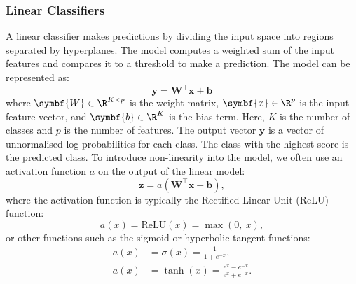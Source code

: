 \documentclass{article}
\begin{document}
\subsubsection{Linear Classifiers}
A linear classifier makes predictions by dividing the input space into
regions separated by hyperplanes. The model computes a weighted sum of
the input features and compares it to a threshold to make a prediction.
The model can be represented as:
\begin{equation*}
    \symbf{y} = \symbf{W}^\top \symbf{x} + \symbf{b}
\end{equation*}
where \(\symbf{W} \in \R^{K \times p}\) is the weight matrix,
\(\symbf{x} \in \R^p\) is the input feature vector, and
\(\symbf{b} \in \R^K\) is the bias term. Here, \(K\) is the
number of classes and \(p\) is the number of features. The output vector
\(\symbf{y}\) is a vector of unnormalised log-probabilities for each
class. The class with the highest score is the predicted class. To
introduce non-linearity into the model, we often use an activation
function \(a\) on the output of the linear model:
\begin{equation*}
    \symbf{z} = a\left( \symbf{W}^\top \symbf{x} + \symbf{b} \right),
\end{equation*}
where the activation function is typically the Rectified Linear Unit
(ReLU) function:
\begin{equation*}
    a\left( x \right) = \mathrm{ReLU}\left( x \right) = \max\left( 0,\: x \right),
\end{equation*}
or other functions such as the sigmoid or hyperbolic tangent functions:
\begin{align*}
    a\left( x \right) & = \sigma\left( x \right) = \frac{1}{1 + e^{-x}},             \\
    a\left( x \right) & = \tanh\left( x \right) = \frac{e^x - e^{-x}}{e^x + e^{-x}}.
\end{align*}
\end{document}
